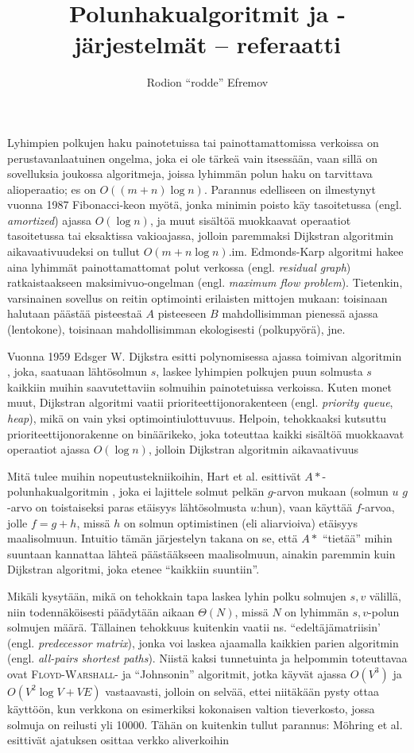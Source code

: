 \documentclass[12pt]{article}
\title{Polunhakualgoritmit ja -järjestelmät -- referaatti}
\author{Rodion ``rodde'' Efremov}
\begin{document}
 \maketitle
\noindent Lyhimpien polkujen haku painotetuissa tai painottamattomissa verkoissa on perustavanlaatuinen ongelma, joka ei ole tärkeä vain itsessään, vaan sillä on sovelluksia joukossa algoritmeja, joissa lyhimmän polun haku on tarvittava alioperaatio; es on $O((m + n) \log n)$. Parannus edelliseen on ilmestynyt vuonna 1987 Fibonacci-keon myötä, jonka minimin poisto käy tasoitetussa (engl. \textit{amortized}) ajassa $O(\log n)$, ja muut sisältöä muokkaavat operaatiot tasoitetussa tai eksaktissa vakioajassa, jolloin paremmaksi Dijkstran algoritmin aikavaativuudeksi on tullut $O(m + n\log n)$.im. Edmonds-Karp algoritmi hakee aina lyhimmät painottamattomat polut verkossa (engl. \textit{residual graph}) ratkaistaakseen maksimivuo-ongelman (engl. \textit{maximum flow problem}). Tietenkin, varsinainen sovellus on reitin optimointi erilaisten mittojen mukaan: toisinaan halutaan päästää pisteestaä $A$ pisteeseen $B$ mahdollisimman pienessä ajassa (lentokone), toisinaan mahdollisimman ekologisesti (polkupyörä), jne.

Vuonna 1959 Edsger W. Dijkstra esitti polynomisessa ajassa toimivan algoritmin \cite{Dijkstra59}, joka, saatuaan lähtösolmun $s$, laskee lyhimpien polkujen puun solmusta $s$ kaikkiin muihin saavutettaviin solmuihin painotetuissa verkoissa. Kuten monet muut, Dijkstran algoritmi vaatii prioriteettijonorakenteen (engl. \textit{priority queue}, \textit{heap}), mikä on vain yksi optimointiulottuvuus. Helpoin, tehokkaaksi kutsuttu prioriteettijonorakenne on binäärikeko, joka toteuttaa kaikki sisältöä muokkaavat operaatiot ajassa $O(\log n)$, jolloin Dijkstran algoritmin aikavaativuus

Mitä tulee muihin nopeutustekniikoihin, Hart et al. esittivät $A\ast$-polun\-hakualgoritmin \cite{Hart68}, joka ei lajittele solmut pelkän $g$-arvon mukaan (solmun $u$ $g$-arvo on toistaiseksi paras etäisyys lähtösolmusta $u$:hun), vaan käyttää $f$-arvoa, jolle $f = g + h$, missä $h$ on solmun optimistinen (eli aliarvioiva) etäisyys maalisolmuun. Intuitio tämän järjestelyn takana on se, että $A\ast$ ``tietää'' mihin suuntaan kannattaa lähteä päästääkseen maalisolmuun, ainakin paremmin kuin Dijkstran algoritmi, joka etenee ``kaikkiin suuntiin''.

Mikäli kysytään, mikä on tehokkain tapa laskea lyhin polku solmujen $s, v$ välillä, niin todennäköisesti päädytään aikaan $\Theta(N)$, missä $N$ on lyhimmän $s, v$-polun solmujen määrä. Tällainen tehokkuus kuitenkin vaatii ns. ``edeltäjämatriisin' (engl. \textit{predecessor matrix}), jonka voi laskea ajaamalla kaikkien parien algoritmin (engl. \textit{all-pairs shortest paths}). Niistä kaksi tunnetuinta ja helpommin toteuttavaa ovat \textsc{Floyd-Warshall}- ja ``Johnsonin'' algoritmit, jotka käyvät ajassa $O(V^3)$ ja $O(V^2 \log V + VE)$ vastaavasti, jolloin on selvää, ettei niitäkään pysty ottaa käyttöön, kun verkkona on esimerkiksi kokonaisen valtion tieverkosto, jossa solmuja on reilusti yli 10000. Tähän on kuitenkin tullut parannus: Möhring et al. esittivät ajatuksen osittaa verkko aliverkoihin


\end{document}
